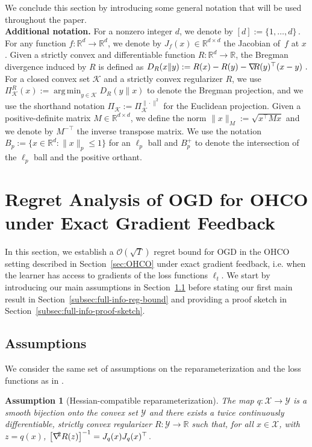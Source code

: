 \documentclass[a4paper,11pt,fullpage]{article}
\def\X{{\mathcal X}}
\def\Y{{\mathcal Y}}
\newcommand{\K}{\ensuremath{\mathcal K}}
\theoremstyle{plain}
\newtheorem{assumption}{Assumption}
\theoremstyle{definition}
\theoremstyle{plain}
\DeclareMathOperator*{\argmin}{arg\,min}
\newcommand{\reals}{\mathbb{R}}
\newcommand{\eqdef}{:=}
\let\nablaold\nabla
\renewcommand{\nabla}{\nablaold\mkern-2.5mu}
\begin{document}
We conclude this section by introducing some general notation that will be used throughout the paper.\\ 

\noindent\textbf{Additional notation.} 
For a nonzero integer $d$, we denote by $[d] :=\{1, \dots, d\}\,.$
For any function $f: \reals^d \rightarrow \reals^d$, we denote by $J_f(x) \in \reals^{d \times d}$ the Jacobian of~$f$ at $x$. 
Given a strictly convex and differentiable function $R:\reals^d \rightarrow \reals$, the Bregman divergence induced by $R$ is defined as
$D_R(x\| y) \eqdef R(x) - R(y) - \nabla R(y)^{\top} (x-y)~.$  
For a closed convex set $\K$ and a strictly convex regularizer $R$, we use $\Pi^R_{\K}(x) \eqdef \argmin_{y \in \K} D_R(y\| x)$ to denote the Bregman projection, 
and we use the shorthand notation $\Pi_{\K} \eqdef \Pi^{\|\cdot \|^2}_{\K}$ for the Euclidean projection.  
Given a positive-definite matrix $M \in \reals^{d \times d}$, we define the norm $\|x\|_M \eqdef \sqrt{x^{\top}Mx}$ and we denote by $M^{-\top}$ the inverse transpose matrix.   
We use the notation $B_p \eqdef \{x \in \reals^d: \|x\|_p \le 1\}$ for an $\ell_p$ ball and 
$B^{+}_p$ to denote the intersection of the $\ell_p$ ball and the positive orthant. 


\section{Regret Analysis of OGD for OHCO under Exact Gradient Feedback} 
\label{sec:full-info}

In this section, we establish a $\mathcal{O}(\sqrt{T})$ regret bound for OGD in the OHCO setting described in Section~\ref{sec:OHCO} 
under exact gradient feedback, i.e. when the learner has access to gradients of the loss functions $\ell_t$. 
We start by introducing our main assumptions in Section~\ref{subsec:full-info-as} before stating our first main result in Section~\ref{subsec:full-info-reg-bound} and providing a proof sketch in Section~\ref{subsec:full-info-proof-sketch}.  

\subsection{Assumptions}
\label{subsec:full-info-as}

We consider the same set of assumptions on the reparameterization and the loss functions as in \citet{ghai-lu-hazan22}.  

\begin{assumption}[Hessian-compatible reparameterization]
\label{as:reparam}
The map $q:\X\to\Y$ is a smooth bijection onto the convex set $\Y$ and there exists a twice continuously differentiable, strictly convex regularizer 
$R:\Y\to\mathbb R$ such that, for all $x\in\X$, with $z=q(x)$, 
$\big[\nabla^2 R(z)\big]^{-1} = J_q(x)J_q(x)^\top\,.$
\end{assumption}
\end{document}

